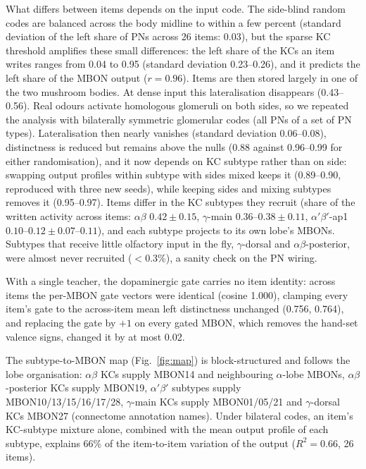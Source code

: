 \documentclass[conference]{IEEEtran}
\begin{document}
What differs between items depends on the input code. The side-blind random
codes are balanced across the body midline to within a few percent
(standard deviation of the left share of PNs across 26 items: 0.03), but the
sparse KC threshold amplifies these small differences: the left share of the
KCs an item writes ranges from 0.04 to 0.95 (standard deviation 0.23--0.26),
and it predicts the left share of the MBON output ($r=0.96$). Items are then
stored largely in one of the two mushroom bodies. At dense input this
lateralisation disappears (0.43--0.56). Real odours activate homologous
glomeruli on both sides, so we repeated the analysis with bilaterally
symmetric glomerular codes (all PNs of a set of PN types). Lateralisation then
nearly vanishes (standard deviation 0.06--0.08), distinctness is reduced but
remains above the nulls (0.88 against 0.96--0.99 for either
randomisation), and it now depends on KC subtype rather than on side:
swapping output profiles within subtype with sides mixed keeps it (0.89--0.90,
reproduced with three new seeds), while
keeping sides and mixing subtypes removes it (0.95--0.97). Items differ in the
KC subtypes they recruit (share of the written activity across items:
$\alpha\beta$ $0.42\pm0.15$, $\gamma$-main $0.36$--$0.38\pm0.11$,
$\alpha'\beta'$-ap1 $0.10$--$0.12\pm0.07$--$0.11$), and each subtype projects
to its own lobe's MBONs. Subtypes that receive little olfactory input in the
fly, $\gamma$-dorsal and $\alpha\beta$-posterior, were almost never recruited
($<0.3\%$), a sanity check on the PN wiring.

With a single teacher, the dopaminergic gate carries no item identity: across
items the per-MBON gate vectors were identical (cosine 1.000), clamping every
item's gate to the across-item mean left distinctness unchanged (0.756,
0.764), and replacing the gate by $+1$ on every gated MBON, which removes the
hand-set valence signs, changed it by at most 0.02.

The subtype-to-MBON map (Fig.~\ref{fig:map}) is block-structured and follows
the lobe organisation: $\alpha\beta$ KCs supply MBON14 and neighbouring
$\alpha$-lobe MBONs, $\alpha\beta$-posterior KCs supply MBON19,
$\alpha'\beta'$ subtypes supply MBON10/13/15/16/17/28, $\gamma$-main KCs supply
MBON01/05/21 and $\gamma$-dorsal KCs MBON27 (connectome annotation names).
Under bilateral codes, an item's KC-subtype mixture alone, combined with the
mean output profile of each subtype, explains 66\% of the item-to-item
variation of the output ($R^2=0.66$, 26 items).
\end{document}
